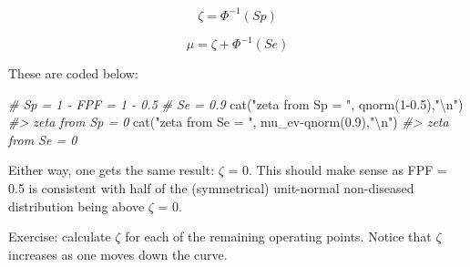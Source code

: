 \documentclass[
]{book}
\newenvironment{Shaded}{\begin{snugshade}}{\end{snugshade}}
\newcommand{\CommentTok}[1]{\textcolor[rgb]{0.56,0.35,0.01}{\textit{#1}}}
\newcommand{\DecValTok}[1]{\textcolor[rgb]{0.00,0.00,0.81}{#1}}
\newcommand{\FloatTok}[1]{\textcolor[rgb]{0.00,0.00,0.81}{#1}}
\newcommand{\FunctionTok}[1]{\textcolor[rgb]{0.00,0.00,0.00}{#1}}
\newcommand{\NormalTok}[1]{#1}
\newcommand{\SpecialCharTok}[1]{\textcolor[rgb]{0.00,0.00,0.00}{#1}}
\newcommand{\StringTok}[1]{\textcolor[rgb]{0.31,0.60,0.02}{#1}}
\begin{document}
\begin{equation*} 
\zeta = \Phi^{-1}\left ( Sp \right )
\label{eq:ratings-paradigm-Zeta}
\end{equation*}

\begin{equation*} 
\mu = \zeta + \Phi^{-1}\left ( Se \right )
\label{eq:ratings-paradigm-Mu}
\end{equation*}

These are coded below:

\begin{Shaded}
\begin{Highlighting}[]
\CommentTok{\# Sp = 1 {-} FPF = 1 {-} 0.5}
\CommentTok{\# Se = 0.9}
\FunctionTok{cat}\NormalTok{(}\StringTok{"zeta from Sp = "}\NormalTok{, }\FunctionTok{qnorm}\NormalTok{(}\DecValTok{1}\FloatTok{{-}0.5}\NormalTok{),}\StringTok{"}\SpecialCharTok{\textbackslash{}n}\StringTok{"}\NormalTok{)}
\CommentTok{\#\textgreater{} zeta from Sp =  0}
\FunctionTok{cat}\NormalTok{(}\StringTok{"zeta from Se = "}\NormalTok{, mu\_ev}\SpecialCharTok{{-}}\FunctionTok{qnorm}\NormalTok{(}\FloatTok{0.9}\NormalTok{),}\StringTok{"}\SpecialCharTok{\textbackslash{}n}\StringTok{"}\NormalTok{)}
\CommentTok{\#\textgreater{} zeta from Se =  0}
\end{Highlighting}
\end{Shaded}

Either way, one gets the same result: \(\zeta\) = 0. This should make sense as FPF = 0.5 is consistent with half of the (symmetrical) unit-normal non-diseased distribution being above \(\zeta\) = 0.

Exercise: calculate \(\zeta\) for each of the remaining operating points. Notice that \(\zeta\) increases as one moves down the curve.
\end{document}
